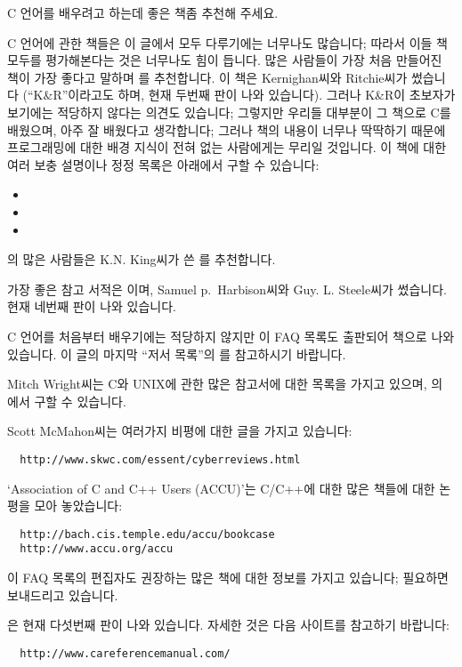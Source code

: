 \begin{faq}
	C 언어를 배우려고 하는데 좋은 책좀 추천해 주세요.

\A	
	C 언어에 관한 책들은 이 글에서 모두 다루기에는 너무나도 많습니다;
	따라서 이들 책 모두를 평가해본다는 것은 너무나도 힘이 듭니다.
	많은 사람들이 가장 처음 만들어진 책이 가장 좋다고 말하며
	를 추천합니다.  이 책은 Kernighan씨와
	Ritchie씨가 썼습니다 (``K\&R''이라고도 하며, 현재 두번째 판이
	나와 있습니다).   그러나 K\&R이 초보자가 보기에는 적당하지 않다는
	의견도 있습니다; 그렇지만 우리들 대부분이 그 책으로 C를 배웠으며,
	아주 잘 배웠다고 생각합니다; 그러나 책의 내용이 너무나 딱딱하기
	때문에 프로그래밍에 대한 배경 지식이 전혀 없는 사람에게는
	무리일 것입니다.   이 책에 대한 여러 보충 설명이나 정정 목록은
	아래에서 구할 수 있습니다:

	\begin{itemize}
	\item {}
	\item {}
	\item {}
	\end{itemize}

	의 많은 사람들은 K.N.  King씨가 쓴
	를 추천합니다.

	가장 좋은 참고 서적은 이며,
	Samuel p.\ Harbison씨와 Guy.  L.  Steele씨가 썼습니다.  현재
	네번째 판이 나와 있습니다.

	C 언어를 처음부터 배우기에는 적당하지 않지만 이 FAQ 목록도
	출판되어 책으로 나와 있습니다. 
	이 글의 마지막 ``저서 목록''의 \cite{cfaqs}를 참고하시기 바랍니다.

	Mitch Wright씨는 C와 UNIX에 관한 많은 참고서에 대한 목록을 가지고
	있으며, 의 에서 구할 수 있습니다.

	Scott McMahon씨는 여러가지 비평에 대한 글을 가지고 있습니다:
\begin{verbatim}
  http://www.skwc.com/essent/cyberreviews.html
\end{verbatim}

	`Association of C and C++ Users (ACCU)'는 C/C++에 대한 
	많은 책들에 대한 논평을 모아 놓았습니다:
\begin{verbatim}
  http://bach.cis.temple.edu/accu/bookcase
  http://www.accu.org/accu
\end{verbatim}

	이 FAQ 목록의 편집자도 권장하는 많은 책에 대한 정보를 가지고
	있습니다; 필요하면 보내드리고 있습니다.  

\T
	은 현재 다섯번째 판이 나와 있습니다.
        자세한 것은 다음 사이트를 참고하기 바랍니다:
\begin{verbatim}
  http://www.careferencemanual.com/
\end{verbatim}

\end{faq}

